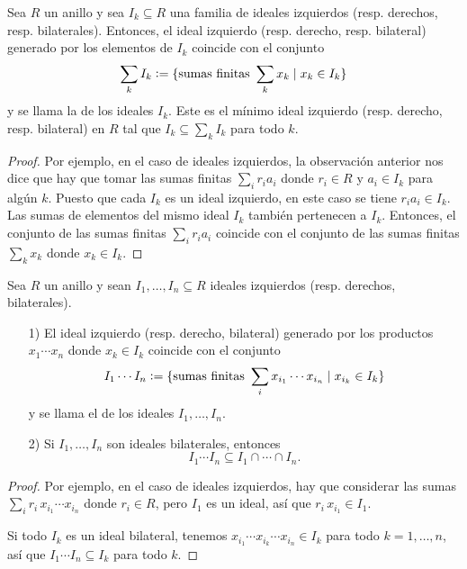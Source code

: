 \begin{corolario}
  Sea $R$ un anillo y sea $I_k \subseteq R$ una familia de ideales izquierdos
  (resp. derechos, resp. bilaterales). Entonces, el ideal izquierdo
  (resp. derecho, resp. bilateral) generado por los elementos de $I_k$ coincide
  con el conjunto
  $$\sum_k I_k \mathrel{\mathop:}= \{ \text{sumas finitas }\sum_k x_k \mid x_k \in I_k \}$$
  y se llama la  de los ideales $I_k$.
  Este es el mínimo ideal izquierdo (resp. derecho, resp. bilateral) en $R$
  tal que $I_k \subseteq \sum_k I_k$ para todo $k$.

  \begin{proof}
    Por ejemplo, en el caso de ideales izquierdos, la observación anterior nos
    dice que hay que tomar las sumas finitas $\sum_i r_i a_i$ donde $r_i \in R$
    y $a_i \in I_k$ para algún $k$. Puesto que cada $I_k$ es un ideal izquierdo,
    en este caso se tiene $r_i a_i \in I_k$. Las sumas de elementos del mismo
    ideal $I_k$ también pertenecen a $I_k$. Entonces, el conjunto de las sumas
    finitas $\sum_i r_i a_i$ coincide con el conjunto de las sumas finitas
    $\sum_k x_k$ donde $x_k \in I_k$.
  \end{proof}
\end{corolario}

\begin{observacion}
  Sea $R$ un anillo y sean $I_1,\ldots,I_n \subseteq R$ ideales izquierdos
  (resp. derechos, bilaterales).

  \begin{enumerate}
  \item[1)] El ideal izquierdo (resp. derecho, bilateral) generado por
    los productos $x_1\cdots x_n$ donde $x_k \in I_k$ coincide con el conjunto
    \[ I_1\cdots I_n \mathrel{\mathop:}=
       \{ \text{sumas finitas } \sum_i x_{i_1}\cdots x_{i_n} \mid
          x_{i_k} \in I_k \} \]
    y se llama el  de los ideales
    $I_1,\ldots,I_n$.

  \item[2)] Si $I_1,\ldots,I_n$ son ideales bilaterales, entonces
    $$I_1\cdots I_n \subseteq I_1\cap \cdots \cap I_n.$$
  \end{enumerate}

  \begin{proof}
    Por ejemplo, en el caso de ideales izquierdos, hay que considerar las sumas
    $\sum_i r_i\,x_{i_1}\cdots x_{i_n}$ donde $r_i \in R$, pero $I_1$ es
    un ideal, así que $r_i\,x_{i_1} \in I_1$.

    Si todo $I_k$ es un ideal bilateral, tenemos
    $x_{i_1} \cdots x_{i_k} \cdots x_{i_n} \in I_k$ para todo $k = 1,\ldots,n$,
    así que $I_1\cdots I_n \subseteq I_k$ para todo $k$.
  \end{proof}
\end{observacion}

